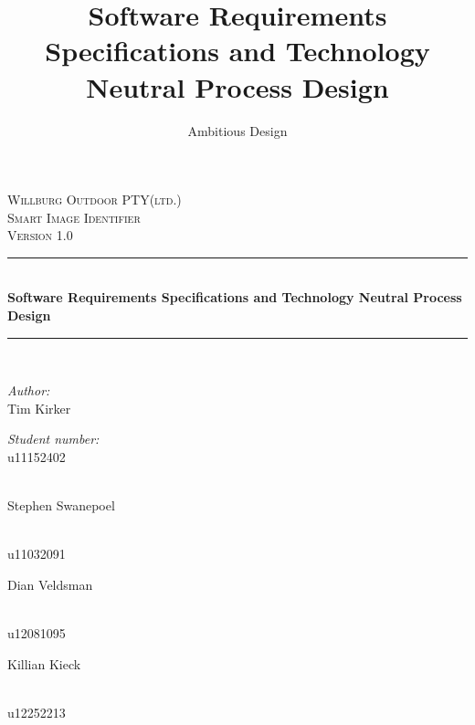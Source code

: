 \documentclass[a4paper,12pt]{report}
\author{Ambitious Design}
\title{ Software Requirements Specifications and Technology Neutral Process Design}
\newcommand{\HRule}{\rule{\linewidth}{0.5mm}}
\begin{document}
\setlength{\parskip}{6pt}

\begin{titlepage}

\begin{center}
\textsc{\LARGE Willburg Outdoor PTY(ltd.)}\\[1.5cm]
\textsc{\Large Smart Image Identifier }\\[1.0cm]
\textsc{\Large Version 1.0 }\\[0.5cm]
\HRule \\[0.4cm]
{ \huge \bfseries  Software Requirements Specifications and Technology Neutral Process Design}\\[0.4cm]
\HRule \\[0.4cm]
\begin{minipage}{0.4\textwidth}
\begin{flushleft} \large
\emph{Author:}\\
Tim {Kirker}
\end{flushleft}
\end{minipage}
\begin{minipage}{0.4\textwidth}
\begin{flushright} \large
\emph{Student number:} \\
u11152402
\end{flushright}
\end{minipage}
\begin{minipage}{0.4\textwidth}
\begin{flushleft} \large
\emph{} \\
Stephen {Swanepoel}
\end{flushleft}
\end{minipage}
\begin{minipage}{0.4\textwidth}
\begin{flushright} \large
\emph{} \\
u11032091
\end{flushright}
\end{minipage}
\begin{minipage}{0.4\textwidth}
\begin{flushleft} \large
Dian {Veldsman}
\end{flushleft}
\end{minipage}
\begin{minipage}{0.4\textwidth}
\begin{flushright} \large
\emph{} \\
u12081095
\end{flushright}
\end{minipage}
\begin{minipage}{0.4\textwidth}
\begin{flushleft} \large
Killian {Kieck}
\end{flushleft}
\end{minipage}
\begin{minipage}{0.4\textwidth}
\begin{flushright} \large
\emph{} \\
u12252213
\end{flushright}
\end{minipage}



\end{center}
\end{titlepage}
\end{document}
